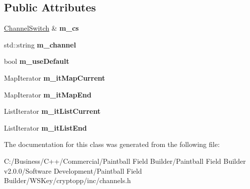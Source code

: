 \subsection*{Public Attributes}
\begin{DoxyCompactItemize}
\item 
\hypertarget{class_channel_route_iterator_a82070a7b3f4a83f552313bce17157e8e}{
\hyperlink{class_channel_switch}{ChannelSwitch} \& {\bfseries m\_\-cs}}
\label{class_channel_route_iterator_a82070a7b3f4a83f552313bce17157e8e}

\item 
\hypertarget{class_channel_route_iterator_ac20002a033d7ad5915b0761aa3458117}{
std::string {\bfseries m\_\-channel}}
\label{class_channel_route_iterator_ac20002a033d7ad5915b0761aa3458117}

\item 
\hypertarget{class_channel_route_iterator_ac7d6fde8284bcaa8d684bae3c079f57c}{
bool {\bfseries m\_\-useDefault}}
\label{class_channel_route_iterator_ac7d6fde8284bcaa8d684bae3c079f57c}

\item 
\hypertarget{class_channel_route_iterator_a643eecd7fa8742e83a962176aacd96cb}{
MapIterator {\bfseries m\_\-itMapCurrent}}
\label{class_channel_route_iterator_a643eecd7fa8742e83a962176aacd96cb}

\item 
\hypertarget{class_channel_route_iterator_aecaa9bae6db03a9b39088cc0e7394d8c}{
MapIterator {\bfseries m\_\-itMapEnd}}
\label{class_channel_route_iterator_aecaa9bae6db03a9b39088cc0e7394d8c}

\item 
\hypertarget{class_channel_route_iterator_a534b382fe373be38f7800d1d92946592}{
ListIterator {\bfseries m\_\-itListCurrent}}
\label{class_channel_route_iterator_a534b382fe373be38f7800d1d92946592}

\item 
\hypertarget{class_channel_route_iterator_a26e6feec14621814bb0047cbc946f0a7}{
ListIterator {\bfseries m\_\-itListEnd}}
\label{class_channel_route_iterator_a26e6feec14621814bb0047cbc946f0a7}

\end{DoxyCompactItemize}


The documentation for this class was generated from the following file:\begin{DoxyCompactItemize}
\item 
C:/Business/C++/Commercial/Paintball Field Builder/Paintball Field Builder v2.0.0/Software Development/Paintball Field Builder/WSKey/cryptopp/inc/channels.h\end{DoxyCompactItemize}
